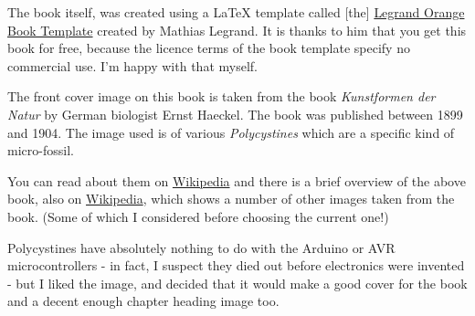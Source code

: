 \begin{appendix}
The book itself, was created using a \LaTeX{} template called [the] \href{https://www.latextemplates.com/template/the-legrand-orange-book}{Legrand Orange Book Template} created by Mathias Legrand. It is thanks to him that you get this book for free, because the licence terms of the book template specify no commercial use. I'm happy with that myself.

The front cover image on this book is taken from the book \emph{Kunstformen der Natur} by German biologist Ernst Haeckel. The book was published between 1899 and 1904. The image used is of various \emph{Polycystines} which are a specific kind of micro-fossil.

You can read about them on \href{https://en.wikipedia.org/wiki/Polycystine}{Wikipedia} and there is a brief overview of the above book, also on \href{https://en.wikipedia.org/wiki/Kunstformen_der_Natur}{Wikipedia},
which shows a number of other images taken from the book. (Some of which I considered before choosing the current one!)

Polycystines have absolutely nothing to do with the Arduino or AVR microcontrollers - in fact, I suspect they died out before electronics were invented - but I liked the image, and decided that it would make a good cover for the book and a decent enough chapter heading image too.





\end{appendix}
